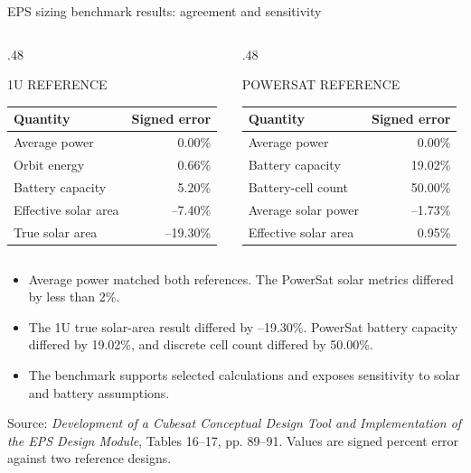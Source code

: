 \documentclass[aspectratio=169,10pt]{beamer}
\newcommand{\source}[1]{{\color{Muted}\fontsize{6.4}{7.2}\selectfont #1\par}}
\newcommand{\metric}[1]{{\color{DarkGray}#1}}
\newenvironment{compactitems}{%
  \begin{itemize}\setlength{\itemsep}{.25em}\setlength{\topsep}{.1em}\setlength{\parskip}{0pt}%
}{\end{itemize}}
\begin{document}
\begin{frame}{EPS sizing benchmark results: agreement and sensitivity}
  \begin{columns}[T,onlytextwidth]
    \begin{column}{.48\textwidth}
      \centering
      {\color{Muted}\fontsize{7}{7.8}\selectfont 1U REFERENCE\par}\vspace{1mm}
      {\fontsize{7.2}{8.5}\selectfont
      \begin{tabular}{l r}
        \hline
        Quantity & Signed error \\
        \hline
        Average power & 0.00\% \\
        Orbit energy & 0.66\% \\
        Battery capacity & 5.20\% \\
        Effective solar area & --7.40\% \\
        True solar area & --19.30\% \\
        \hline
      \end{tabular}}
    \end{column}
    \begin{column}{.48\textwidth}
      \centering
      {\color{Muted}\fontsize{7}{7.8}\selectfont POWERSAT REFERENCE\par}\vspace{1mm}
      {\fontsize{7.2}{8.5}\selectfont
      \begin{tabular}{l r}
        \hline
        Quantity & Signed error \\
        \hline
        Average power & 0.00\% \\
        Battery capacity & 19.02\% \\
        Battery-cell count & 50.00\% \\
        Average solar power & --1.73\% \\
        Effective solar area & 0.95\% \\
        \hline
      \end{tabular}}
    \end{column}
  \end{columns}
  \vspace{2mm}
  \begin{compactitems}
    \item Average power matched both references. The PowerSat solar metrics differed by less than 2\%.
    \item The 1U true solar-area result differed by \metric{--19.30\%}. PowerSat battery capacity differed by \metric{19.02\%}, and discrete cell count differed by \metric{50.00\%}.
    \item The benchmark supports selected calculations and exposes sensitivity to solar and battery assumptions.
  \end{compactitems}
  \vfill
  \source{Source: \emph{Development of a Cubesat Conceptual Design Tool and Implementation of the EPS Design Module}, Tables 16--17, pp. 89--91. Values are signed percent error against two reference designs.}
\end{frame}
\end{document}
